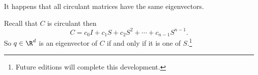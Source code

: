 

It happens that all circulant matrices have the same eigenvectors.


Recall that $C$ is circulant then
\[
  C = c_0I + c_1 S + c_2S^2 + \cdots + c_{n-1}S^{n-1}.
\]
So $q \in \R^d$ is an eigenvector of $C$ if and only if it is one of $S$.\footnote{Future editions will complete this development.}


\blankpage
